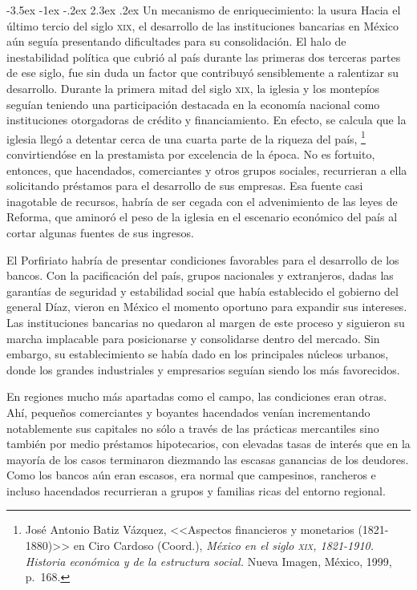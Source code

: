 \documentclass[14pt,twoside,final]{extbook} %
\makeatletter
\let\oldfootnote\footnote
\renewcommand\footnote[1]{%
\oldfootnote{\hspace{1mm}#1}}
\renewcommand\section{\@startsection {section}{1}{\z@}%
                                     {-3.5ex \@plus -1ex \@minus -.2ex}%
                                     {2.3ex \@plus .2ex}%
                                     {\normalfont\large\bfseries\sc}}
\makeatother
\begin{document}
\section{Un mecanismo de enriquecimiento: la usura}\label{sec:usura}
Hacia el último tercio del siglo \textsc{xix}, el desarrollo de las instituciones bancarias en México aún seguía presentando dificultades para su consolidación. El halo de inestabilidad política que cubrió al país durante las primeras dos terceras partes de ese siglo, fue sin duda un factor que
contribuyó sensiblemente a ralentizar su desarrollo. Durante la primera mitad del siglo \textsc{xix}, la iglesia y los montepíos seguían teniendo una participación destacada en la economía nacional como instituciones otorgadoras de crédito y financiamiento. En efecto, se calcula que la iglesia llegó a detentar cerca de una cuarta parte de la riqueza del país,\footnote{José Antonio Batiz Vázquez, <<Aspectos financieros y monetarios (1821-1880)>> en Ciro Cardoso (Coord.), \emph{México en el siglo \textsc{xix}, 1821-1910. Historia económica y de la estructura social.} Nueva Imagen, México, 1999, p.~168.} convirtiendóse en la prestamista por excelencia de la época. No es fortuito, entonces, que hacendados, comerciantes y otros grupos sociales, recurrieran a ella solicitando préstamos para el desarrollo de sus empresas. Esa fuente casi inagotable de recursos, habría de ser cegada con el advenimiento de las leyes de Reforma, que aminoró el peso de la iglesia en el escenario económico del país al cortar algunas fuentes de sus ingresos.

El Porfiriato habría de presentar condiciones favorables para el desarrollo de los bancos. Con la pacificación del país, grupos nacionales y extranjeros, dadas las garantías de seguridad y estabilidad social que había establecido el gobierno del general Díaz, vieron en México el momento oportuno para expandir sus intereses. Las instituciones bancarias no quedaron al margen de este proceso y siguieron su marcha implacable para posicionarse y consolidarse dentro del mercado. Sin embargo, su establecimiento se había dado en los principales núcleos urbanos, donde los grandes industriales y empresarios seguían siendo los más favorecidos.

En regiones mucho más apartadas como el campo, las condiciones eran otras. Ahí, pequeños comerciantes y boyantes hacendados venían incrementando notablemente sus capitales no sólo a través de las prácticas mercantiles sino también por medio préstamos hipotecarios, con elevadas tasas de interés que en la mayoría de los casos terminaron diezmando las escasas ganancias de los deudores. Como los
bancos aún eran escasos, era normal que campesinos, rancheros e incluso hacendados recurrieran a grupos y familias ricas del entorno regional.
\end{document}
